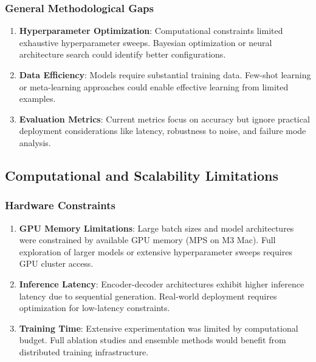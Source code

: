 \documentclass[conference]{IEEEtran}
\begin{document}
\subsubsection{General Methodological Gaps}
\begin{enumerate}
  \item \textbf{Hyperparameter Optimization}: Computational constraints limited exhaustive hyperparameter sweeps. Bayesian optimization or neural architecture search could identify better configurations.

  \item \textbf{Data Efficiency}: Models require substantial training data. Few-shot learning or meta-learning approaches could enable effective learning from limited examples.

  \item \textbf{Evaluation Metrics}: Current metrics focus on accuracy but ignore practical deployment considerations like latency, robustness to noise, and failure mode analysis.
\end{enumerate}

\subsection{Computational and Scalability Limitations}

\subsubsection{Hardware Constraints}
\begin{enumerate}
  \item \textbf{GPU Memory Limitations}: Large batch sizes and model architectures were constrained by available GPU memory (MPS on M3 Mac). Full exploration of larger models or extensive hyperparameter sweeps requires GPU cluster access.

  \item \textbf{Inference Latency}: Encoder-decoder architectures exhibit higher inference latency due to sequential generation. Real-world deployment requires optimization for low-latency constraints.

  \item \textbf{Training Time}: Extensive experimentation was limited by computational budget. Full ablation studies and ensemble methods would benefit from distributed training infrastructure.
\end{enumerate}
\end{document}
